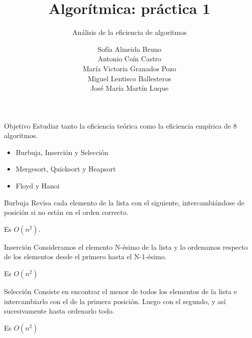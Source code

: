 \documentclass[spanish]{beamer}
\title{Algorítmica: práctica 1}
\subtitle{Análisis de la eficiencia de algoritmos}
\author{Sofía Almeida Bruno\\ Antonio Coín Castro\\ María Victoria Granados Pozo\\ Miguel Lentisco Ballesteros\\ José María Martín Luque}
\begin{document}
\maketitle

\begin{frame}{Objetivo}
	Estudiar tanto la eficiencia teórica como la eficiencia empírica de 8 algoritmos.
	
	\begin{itemize}
		\item Burbuja, Inserción y Selección
		\item Mergesort, Quicksort y Heapsort
		\item Floyd y Hanoi
	\end{itemize}
\end{frame}

\begin{frame}{Burbuja}
	Revisa cada elemento de la lista con el siguiente, intercambiándose de posición si no están en el orden correcto.
	
	\vskip 0.5cm
	
	Es $O(n^2)$.
	
\end{frame}

\begin{frame}{}
	\begin{center}
		
	\end{center}
\end{frame}

\begin{frame}{Inserción}
	Consideramos el elemento N-ésimo de la lista y lo ordenamos respecto de los elementos desde el primero hasta el N-1-ésimo.
	
	\vskip 0.5cm
	
	Es $O(n^2)$
\end{frame}

\begin{frame}
	\begin{center}
		
	\end{center}
\end{frame}

\begin{frame}{Selección}
	Consiste en encontrar el menor de todos los elementos de la lista e intercambiarlo con el de la primera posición. Luego con el segundo, y así sucesivamente hasta ordenarlo todo.
	\vskip 0.5cm
	
	Es $O(n^2)$
\end{frame}
\end{document}
